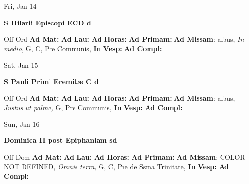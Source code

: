\documentclass[10pt]{book}
\begin{document}
\begin{center}
\begin{minipage}{3.5in}
\vspace{2em}
\begin{center}Fri, Jan 14
\end{center}
\textbf{ \large S Hilarii Episcopi ECD
\textnormal{\normalsize d}}

\begin{justify}Off Ord
\textbf{Ad Mat: }
\textbf{Ad Lau: }
\textbf{Ad Horas: }
\textbf{Ad Primam: }\textbf{Ad Missam}: albus, \textit{In medio,} G, C, Pre Communis, 
\textbf{In Vesp: }
\textbf{Ad Compl: }
\end{justify}
\end{minipage}
\end{center}

\begin{center}
\begin{minipage}{3.5in}
\vspace{2em}
\begin{center}Sat, Jan 15
\end{center}
\textbf{ \large S Pauli Primi Eremitæ C
\textnormal{\normalsize d}}

\begin{justify}Off Ord
\textbf{Ad Mat: }
\textbf{Ad Lau: }
\textbf{Ad Horas: }
\textbf{Ad Primam: }\textbf{Ad Missam}: albus, \textit{Justus ut palma,} G, Pre Communis, 
\textbf{In Vesp: }
\textbf{Ad Compl: }
\end{justify}
\end{minipage}
\end{center}

\begin{center}
\begin{minipage}{3.5in}
\vspace{2em}
\begin{center}Sun, Jan 16
\end{center}
\textbf{ \large Dominica II post Epiphaniam
\textnormal{\normalsize sd}}

\begin{justify}Off Dom
\textbf{Ad Mat: }
\textbf{Ad Lau: }
\textbf{Ad Horas: }
\textbf{Ad Primam: }\textbf{Ad Missam}: COLOR NOT DEFINED, \textit{Omnis terra,} G, C, Pre de Ssma Trinitate, 
\textbf{In Vesp: }
\textbf{Ad Compl: }
\end{justify}
\end{minipage}
\end{center}
\end{document}
